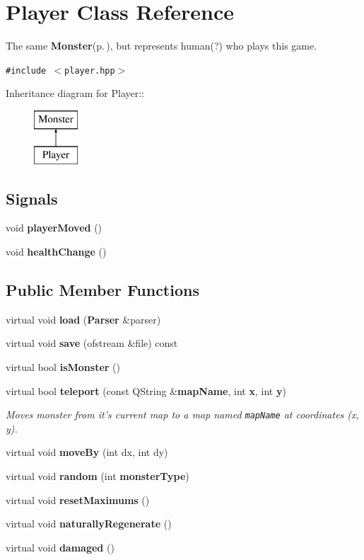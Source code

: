 \section{Player Class Reference}
\label{classPlayer}
The same {\bf Monster}{\rm (p.\,\pageref{classMonster})}, but represents human(?) who plays this game.  


{\tt \#include $<$player.hpp$>$}

Inheritance diagram for Player::\begin{figure}[H]
\begin{center}
\leavevmode
\includegraphics[height=2cm]{classPlayer}
\end{center}
\end{figure}
\subsection*{Signals}
\begin{CompactItemize}
\item 
void {\bf player\-Moved} ()
\item 
void {\bf health\-Change} ()
\end{CompactItemize}
\subsection*{Public Member Functions}
\begin{CompactItemize}
\item 
virtual void {\bf load} ({\bf Parser} \&parser)
\item 
virtual void {\bf save} (ofstream \&file) const 
\item 
virtual bool {\bf is\-Monster} ()
\item 
virtual bool {\bf teleport} (const QString \&{\bf map\-Name}, int {\bf x}, int {\bf y})
\begin{CompactList}\small\item\em Moves monster from it's current map to a map named {\tt map\-Name} at coordinates (x, y). \item\end{CompactList}\item 
virtual void {\bf move\-By} (int dx, int dy)
\item 
virtual void {\bf random} (int {\bf monster\-Type})
\item 
virtual void {\bf reset\-Maximums} ()
\item 
virtual void {\bf naturally\-Regenerate} ()
\item 
virtual void {\bf damaged} ()
\end{CompactItemize}


